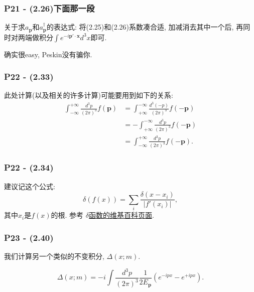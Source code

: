 \documentclass[cn,hazy,blue,11pt,device=normal,chinesefont=founder]{elegantnote}
\begin{document}
\subsubsection{P21 - (2.26)下面那一段}

关于求$a_\mathbf{p}$和$a^{\dagger}_\mathbf{p}$的表达式: 将(2.25)和(2.26)系数凑合适, 加减消去其中一个后, 再同时对两端做积分$\int e^{-i\mathbf{p'\cdot x}} d^3 x$即可. 

\begin{remark}
  确实很easy, Peskin没有骗你. 
\end{remark}

\subsubsection{P22 - (2.33)}

此处计算(以及相关的许多计算)可能要用到如下的关系: 
\begin{equation}
  \begin{aligned}
  \int_{-\infty}^{+\infty}\frac{d^3 p}{(2\pi)^3}f(\mathbf p) &= \int_{+\infty}^{-\infty}\frac{d^3 (-p)}{(2\pi)^3}f(-\mathbf p) \\
  &= -\int_{+\infty}^{-\infty}\frac{d^3 p}{(2\pi)^3}f(-\mathbf p) \\
  &= \int_{-\infty}^{+\infty}\frac{d^3 p}{(2\pi)^3}f(-\mathbf p).
  \end{aligned}
\end{equation}

\subsubsection{P22 - (2.34)}

建议记这个公式: 
\begin{equation}
  \delta(f(x)) = \sum_i \frac{\delta(x-x_i)}{|f'(x_i)|}, 
\end{equation}
其中$x_i$是$f(x)$的根. 参考 \href{https://zh.wikipedia.org/wiki/狄拉克δ函数#與函數的復合}{$\delta$函数的维基百科页面}. 

\subsubsection{P23 - (2.40)} \label{subsubsec: Invar_Delta}

我们计算另一个类似的不变积分, $\Delta(x; m)$. 

\begin{definition}
  \begin{equation}
    \Delta(x; m) = -i\int\frac{d^3 p}{(2\pi)^3} \frac{1}{2E_\mathbf{p}}(e^{-ipx} - e^{+ipx}). 
  \end{equation}
\end{definition}
\end{document}
